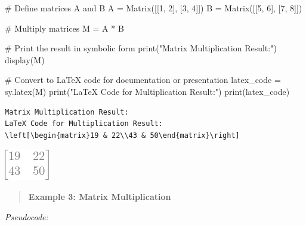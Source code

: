 \documentclass[
  letterpaper,
  DIV=11,
  numbers=noendperiod]{scrreprt}
\newenvironment{Shaded}{\begin{snugshade}}{\end{snugshade}}
\newcommand{\BuiltInTok}[1]{\textcolor[rgb]{0.00,0.23,0.31}{#1}}
\newcommand{\CommentTok}[1]{\textcolor[rgb]{0.37,0.37,0.37}{#1}}
\newcommand{\DecValTok}[1]{\textcolor[rgb]{0.68,0.00,0.00}{#1}}
\newcommand{\NormalTok}[1]{\textcolor[rgb]{0.00,0.23,0.31}{#1}}
\newcommand{\OperatorTok}[1]{\textcolor[rgb]{0.37,0.37,0.37}{#1}}
\newcommand{\StringTok}[1]{\textcolor[rgb]{0.13,0.47,0.30}{#1}}
\theoremstyle{plain}
\theoremstyle{definition}
\theoremstyle{remark}
\begin{document}
\begin{Shaded}
\begin{Highlighting}[]
\CommentTok{\# Define matrices A and B}
\NormalTok{A }\OperatorTok{=}\NormalTok{ Matrix([[}\DecValTok{1}\NormalTok{, }\DecValTok{2}\NormalTok{], [}\DecValTok{3}\NormalTok{, }\DecValTok{4}\NormalTok{]])}
\NormalTok{B }\OperatorTok{=}\NormalTok{ Matrix([[}\DecValTok{5}\NormalTok{, }\DecValTok{6}\NormalTok{], [}\DecValTok{7}\NormalTok{, }\DecValTok{8}\NormalTok{]])}

\CommentTok{\# Multiply matrices}
\NormalTok{M }\OperatorTok{=}\NormalTok{ A }\OperatorTok{*}\NormalTok{ B}

\CommentTok{\# Print the result in symbolic form}
\BuiltInTok{print}\NormalTok{(}\StringTok{"Matrix Multiplication Result:"}\NormalTok{)}
\NormalTok{display(M)}

\CommentTok{\# Convert to LaTeX code for documentation or presentation}
\NormalTok{latex\_code }\OperatorTok{=}\NormalTok{ sy.latex(M)}
\BuiltInTok{print}\NormalTok{(}\StringTok{"LaTeX Code for Multiplication Result:"}\NormalTok{)}
\BuiltInTok{print}\NormalTok{(latex\_code)}
\end{Highlighting}
\end{Shaded}

\begin{verbatim}
Matrix Multiplication Result:
LaTeX Code for Multiplication Result:
\left[\begin{matrix}19 & 22\\43 & 50\end{matrix}\right]
\end{verbatim}

\includegraphics{module_1_files/figure-pdf/cell-5-output-2.png}

\begin{quote}
\textbf{Example 3: Matrix Multiplication}
\end{quote}

\emph{Pseudocode:}
\end{document}
